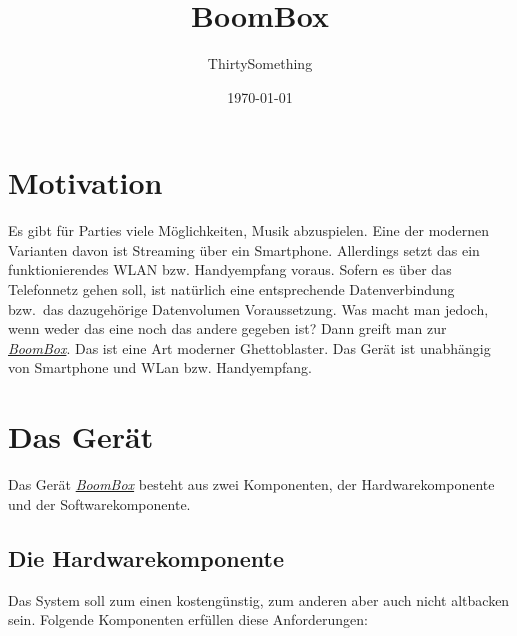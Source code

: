 \documentclass[12pt,a4paper]{article}
\author{ThirtySomething}
\title{BoomBox}
\date{\today}
\newcommand{\bb}{\textit{\href{https://github.com/ThirtySomething/BoomBox}{BoomBox}}}
\begin{document}
\clearpage\maketitle
\thispagestyle{empty}
\newpage

\tableofcontents
{}
\newpage

\section{Motivation}
Es gibt für Parties viele Möglichkeiten, Musik abzuspielen. Eine der modernen Varianten davon ist Streaming über ein Smartphone. Allerdings setzt das
ein funktionierendes WLAN bzw. Handyempfang voraus. Sofern es über das Telefonnetz gehen soll, ist natürlich eine entsprechende Datenverbindung bzw.~das
dazugehörige Datenvolumen Voraussetzung. Was macht man jedoch, wenn weder das eine noch das andere gegeben ist? Dann greift man zur \bb{}.
Das ist eine Art moderner Ghettoblaster. Das Gerät ist unabhängig von Smartphone und WLan bzw. Handyempfang.

\section{Das Gerät}
Das Gerät \bb{} besteht aus zwei Komponenten, der Hardwarekomponente und der Softwarekomponente.

\subsection{Die Hardwarekomponente}
Das System soll zum einen kostengünstig, zum anderen aber auch nicht altbacken sein. Folgende Komponenten erfüllen diese Anforderungen:
\end{document}
